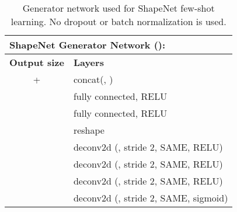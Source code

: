 \documentclass{article}
\begin{document}
\begin{table}[!h]
    \caption{Generator network used for ShapeNet few-shot learning. No dropout or batch normalization is used.}
	\centering
	\begin{tabular}{cl}
		\multicolumn{2}{l}{\textbf{ShapeNet Generator Network ():} } \\
		\toprule
		\textbf{Output size} & \textbf{Layers} \\
        \midrule
         +  & concat(, ) \\
         & fully connected, RELU \\
         & fully connected, RELU \\
         & reshape \\
		 & deconv2d (, stride 2, SAME, RELU) \\
		 & deconv2d (, stride 2, SAME, RELU) \\
		 & deconv2d (, stride 2, SAME, RELU) \\
		 & deconv2d (, stride 2, SAME, sigmoid) \\
        \bottomrule
	\end{tabular}
    \vspace{2mm}
	\label{table:decoder_shapenet}
\end{table}

\clearpage
\pagebreak
\newpage
\end{document}
